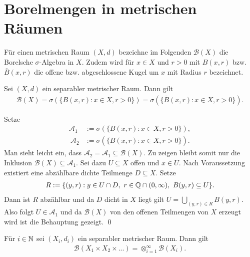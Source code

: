 \section{Borelmengen in metrischen Räumen}
Für einen metrischen Raum $(X,d)$ bezeichne im Folgenden $\mathcal{B}(X)$ die Borelsche $\sigma$-Algebra in $X$. 
Zudem wird für $x \in X$ und $r>0$ mit $B(x, r)$ bzw. $\overline{B}(x,r)$ die offene bzw. abgeschlossene Kugel um $x$ mit Radius $r$ bezeichnet.
\begin{proposition}
    Sei $(X,d)$ ein separabler metrischer Raum. Dann gilt
    \begin{align*}
        \mathcal{B}(X) = \sigma(\{B(x,r): x \in X, r > 0 \}) = \sigma(\{\overline{B}(x,r): x \in X, r > 0 \}). 
    \end{align*}
\end{proposition}
\begin{proof*}
    Setze 
    \begin{align*}
        \mathcal{A}_1 &:= \sigma(\{B(x,r): x \in X, r > 0 \}), \\\ 
        \mathcal{A}_2 &:= \sigma(\{\overline{B}(x,r): x \in X, r > 0 \}). 
    \end{align*}
    Man sieht leicht ein, dass $\mathcal{A}_2 = \mathcal{A}_1 \subseteq \mathcal{B}(X)$. Zu zeigen bleibt somit nur die Inklusion $\mathcal{B}(X) \subseteq \mathcal{A}_1$.
    Sei dazu $U \subseteq X$ offen und $x \in U$. Nach Voraussetzung existiert eine abzählbare dichte Teilmenge $D \subseteq X$. Setze  
    \begin{align*}
        R := \{(y,r) : y \in U \cap D, \ r \in \mathbb{Q} \cap (0, \infty), \  B(y,r) \subseteq U \}.
    \end{align*}
    Dann ist $R$ abzählbar und da $D$ dicht in $X$ liegt gilt $U = \bigcup_{(y,r) \in R}B(y,r)$. 
    Also folgt $U \in \mathcal{A}_1$ und da $\mathcal{B}(X)$ von den offenen Teilmengen von $X$ erzeugt wird ist die Behauptung gezeigt. \qed
\end{proof*}

\begin{proposition}
    Für $i \in \mathbb{N}$ sei $(X_i, d_i)$ ein separabler metrischer Raum. Dann gilt
    \begin{align*}
        \mathcal{B}(X_1 \times X_2 \times ...) = \otimes_{i=1}^{\infty}\mathcal{B}(X_i).
    \end{align*}
\end{proposition}


